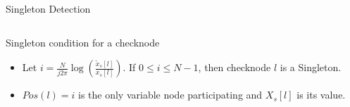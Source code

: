 \documentclass[10pt,xcolor=table]{beamer}
\begin{document}
\begin{frame}{Singleton Detection}
\begin{columns}
			\end{columns}
			\begin{block}{Singleton condition for a checknode}
			\begin{itemize}
				\item Let $i=\frac{N}{j2\pi} \log(\frac{\tilde{x}_s[l]}{x_s[l]})$. If {\color{blue} $0 \leq i \leq N-1$}, then checknode $l$ is a \alert{Singleton}.\\
				\item $Pos(l) = i$ is the only variable node participating and $X_s[l]$ is its value.
			\end{itemize}
				
			\end{block}
			
	\end{frame}	

%
%
\end{document}
